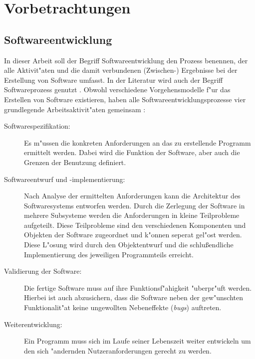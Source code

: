 \chapter{Vorbetrachtungen}

\section{Softwareentwicklung}

In dieser Arbeit soll der Begriff Softwareentwicklung den Prozess benennen, der alle Aktivit"aten und die damit verbundenen (Zwischen-) Ergebnisse bei der Erstellung von Software umfasst.
In der Literatur wird auch der Begriff Softwareprozess genutzt \cite{Sommerville2001a}.
Obwohl verschiedene Vorgehensmodelle f"ur das Erstellen von Software existieren, haben alle Softwareentwicklungsprozesse vier grundlegende Arbeitsaktivit"aten gemeinsam \cite{Brugge2004a,Sommerville2001a}:
\begin{description}
	\item[Softwarespezifikation:] Es m"ussen die konkreten Anforderungen an das zu erstellende Programm ermittelt werden.
								  Dabei wird die Funktion der Software, aber auch die Grenzen der Benutzung definiert.
	\item[Softwareentwurf und -implementierung:] Nach Analyse der ermittelten Anforderungen kann die Architektur des Softwaresystems entworfen werden.
												 Durch die Zerlegung der Software in mehrere Subsysteme werden die Anforderungen in kleine Teilprobleme aufgeteilt.
												 Diese Teilprobleme sind den verschiedenen Komponenten und Objekten der Software zugeordnet und k"onnen seperat gel"ost werden.
												 Diese L"osung wird durch den Objektentwurf und die schlu\ss endliche Implementierung des jeweiligen Programmteils erreicht.
	\item[Validierung der Software:] Die fertige Software muss auf ihre Funktionsf"ahigkeit "uberpr"uft werden.
									 Hierbei ist auch abzusichern, dass die Software neben der gew"unschten Funktionalit"at keine ungewollten Nebeneffekte (\emph{bugs}) auftreten.
	\item[Weiterentwicklung:] Ein Programm muss sich im Laufe seiner Lebenszeit weiter entwickeln um den sich "andernden Nutzeranforderungen gerecht zu werden.
\end{description}

